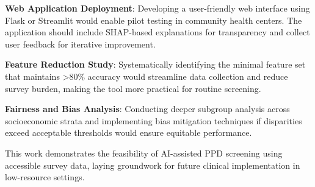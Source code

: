 \textbf{Web Application Deployment}: Developing a user-friendly web interface using Flask or Streamlit would enable pilot testing in community health centers. The application should include SHAP-based explanations for transparency and collect user feedback for iterative improvement.

\textbf{Feature Reduction Study}: Systematically identifying the minimal feature set that maintains >80\% accuracy would streamline data collection and reduce survey burden, making the tool more practical for routine screening.

\textbf{Fairness and Bias Analysis}: Conducting deeper subgroup analysis across socioeconomic strata and implementing bias mitigation techniques if disparities exceed acceptable thresholds would ensure equitable performance.


This work demonstrates the feasibility of AI-assisted PPD screening using accessible survey data, laying groundwork for future clinical implementation in low-resource settings.